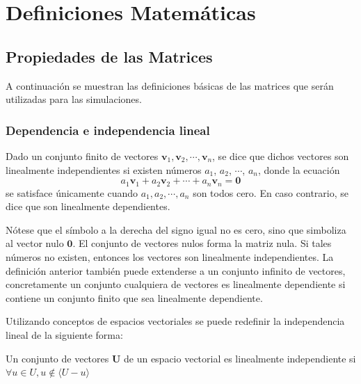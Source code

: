 
\chapter{Definiciones Matemáticas} %

\label{AppendixB} %


\section{Propiedades de las Matrices}

A continuación se muestran las definiciones básicas de las matrices que serán utilizadas para las simulaciones.

\subsection{Dependencia e independencia lineal}

Dado un conjunto finito de vectores $\mathbf{v}_1, \mathbf{v}_2,\cdots, \mathbf{v}_n$, se dice que dichos vectores son linealmente
independientes si existen números $a_1$, $a_2$, $\cdots$, $a_n$, donde la ecuación
$$
 a_1 \mathbf{v}_1 + a_2 \mathbf{v}_2 + \cdots + a_n \mathbf{v}_n = \mathbf{0} 
$$
se satisface únicamente cuando $a_1, a_2,\cdots, a_n$ son todos cero. En caso contrario, se dice que son linealmente dependientes.

Nótese que el símbolo a la derecha del signo igual no es cero, sino que simboliza al vector nulo $\mathbf{0}$. El conjunto de
vectores nulos forma la matriz nula. Si tales números no existen, entonces los vectores son linealmente independientes. La 
definición anterior también puede extenderse a un conjunto infinito de vectores, concretamente un conjunto cualquiera de 
vectores es linealmente dependiente si contiene un conjunto finito que sea linealmente dependiente.

Utilizando conceptos de espacios vectoriales se puede redefinir la independencia lineal de la siguiente forma:

Un conjunto de vectores $\textbf{U}$ de un espacio vectorial es linealmente independiente si 
$\forall u \in U, u \notin \langle U - u \rangle$

